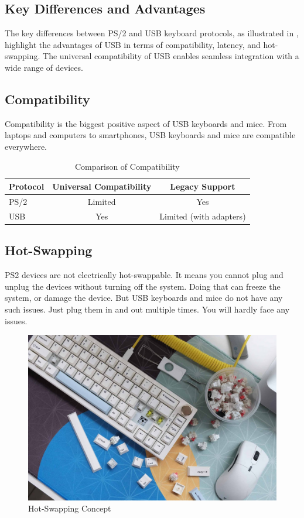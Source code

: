 \subsection{Key Differences and Advantages}
The key differences between PS/2 \cite{chapweske2003ps} and USB keyboard protocols, as illustrated in \cite{lee2011keyboard}, highlight the advantages of USB in terms of compatibility, latency, and hot-swapping. The universal compatibility of USB enables seamless integration with a wide range of devices.

\subsection{Compatibility}
Compatibility is the biggest positive aspect of USB keyboards and mice. From laptops and computers to smartphones, USB keyboards and mice are compatible everywhere.
\begin{table}[htbp]
    \centering
    \caption{Comparison of Compatibility}
    \begin{tabular}{|l|c|c|}
        \hline
        \textbf{Protocol} & \textbf{Universal Compatibility} & \textbf{Legacy Support} \\
        \hline
        PS/2 & Limited & Yes \\
        \hline
        USB & Yes & Limited (with adapters) \\
        \hline
    \end{tabular}
\end{table}

\subsection{Hot-Swapping}
PS2 devices are not electrically hot-swappable. It means you cannot plug and unplug the devices without turning off the system. Doing that can freeze the system, or damage the device. But USB keyboards and mice do not have any such issues. Just plug them in and out multiple times. You will hardly face any issues.
\begin{figure}[htbp]
    \centering
    \includegraphics[width=0.6\linewidth]{images/hot-swapping.jpg}
    \caption{Hot-Swapping Concept}
    \label{fig:hot-swapping}
\end{figure}

